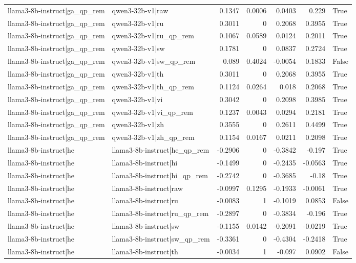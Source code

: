\begin{table}
\begin{tabular}{l l r r r r l}
llama3-8b-instruct|ga_qp_rem & qwen3-32b-v1|raw & 0.1347 & 0.0006 & 0.0403 & 0.229 & True \\
llama3-8b-instruct|ga_qp_rem & qwen3-32b-v1|ru & 0.3011 & 0 & 0.2068 & 0.3955 & True \\
llama3-8b-instruct|ga_qp_rem & qwen3-32b-v1|ru_qp_rem & 0.1067 & 0.0589 & 0.0124 & 0.2011 & True \\
llama3-8b-instruct|ga_qp_rem & qwen3-32b-v1|sw & 0.1781 & 0 & 0.0837 & 0.2724 & True \\
llama3-8b-instruct|ga_qp_rem & qwen3-32b-v1|sw_qp_rem & 0.089 & 0.4024 & -0.0054 & 0.1833 & False \\
llama3-8b-instruct|ga_qp_rem & qwen3-32b-v1|th & 0.3011 & 0 & 0.2068 & 0.3955 & True \\
llama3-8b-instruct|ga_qp_rem & qwen3-32b-v1|th_qp_rem & 0.1124 & 0.0264 & 0.018 & 0.2068 & True \\
llama3-8b-instruct|ga_qp_rem & qwen3-32b-v1|vi & 0.3042 & 0 & 0.2098 & 0.3985 & True \\
llama3-8b-instruct|ga_qp_rem & qwen3-32b-v1|vi_qp_rem & 0.1237 & 0.0043 & 0.0294 & 0.2181 & True \\
llama3-8b-instruct|ga_qp_rem & qwen3-32b-v1|zh & 0.3555 & 0 & 0.2611 & 0.4499 & True \\
llama3-8b-instruct|ga_qp_rem & qwen3-32b-v1|zh_qp_rem & 0.1154 & 0.0167 & 0.0211 & 0.2098 & True \\
llama3-8b-instruct|he & llama3-8b-instruct|he_qp_rem & -0.2906 & 0 & -0.3842 & -0.197 & True \\
llama3-8b-instruct|he & llama3-8b-instruct|hi & -0.1499 & 0 & -0.2435 & -0.0563 & True \\
llama3-8b-instruct|he & llama3-8b-instruct|hi_qp_rem & -0.2742 & 0 & -0.3685 & -0.18 & True \\
llama3-8b-instruct|he & llama3-8b-instruct|raw & -0.0997 & 0.1295 & -0.1933 & -0.0061 & True \\
llama3-8b-instruct|he & llama3-8b-instruct|ru & -0.0083 & 1 & -0.1019 & 0.0853 & False \\
llama3-8b-instruct|he & llama3-8b-instruct|ru_qp_rem & -0.2897 & 0 & -0.3834 & -0.196 & True \\
llama3-8b-instruct|he & llama3-8b-instruct|sw & -0.1155 & 0.0142 & -0.2091 & -0.0219 & True \\
llama3-8b-instruct|he & llama3-8b-instruct|sw_qp_rem & -0.3361 & 0 & -0.4304 & -0.2418 & True \\
llama3-8b-instruct|he & llama3-8b-instruct|th & -0.0034 & 1 & -0.097 & 0.0902 & False \\

\end{tabular}
\end{table}
